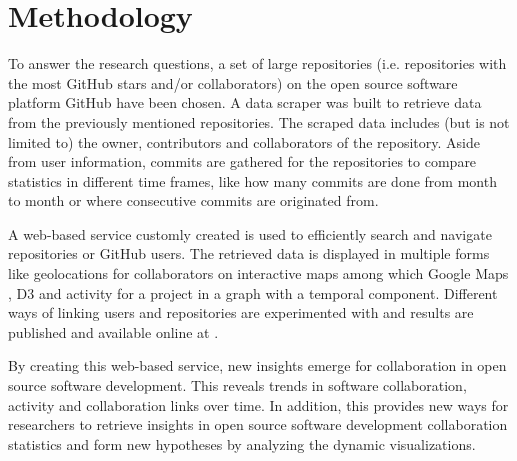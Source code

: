 \documentclass[acmtog, authorversion]{acmart}
\begin{document}
\section{Methodology}
To answer the research questions,  a set of large repositories (i.e. repositories with the most GitHub stars and/or collaborators) on the open source software platform GitHub have been chosen.
A data scraper was built to retrieve data from the previously mentioned repositories.
The scraped data includes (but is not limited to) the owner, contributors and collaborators of the repository.
Aside from user information, commits are gathered for the repositories to compare statistics in different time frames, like how many commits are done from month to month or where consecutive commits are originated from.

A web-based service customly created is used to efficiently search and navigate repositories or GitHub users.
The retrieved data is displayed in multiple forms like geolocations for collaborators on  interactive maps among which Google Maps \cite{GoogleMaps}, D3 \cite{D3} and activity for a project in a graph with a temporal component.
Different ways of linking users and repositories are experimented with and results are published and available online at \cite{githubvisualizerovertime}.

By creating this web-based service, new insights emerge for collaboration in open source software development.
This reveals trends in software collaboration, activity and collaboration links over time.
In addition, this provides new ways for researchers to retrieve insights in open source software development collaboration statistics and form new hypotheses by analyzing the dynamic visualizations.
\end{document}
